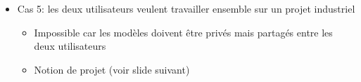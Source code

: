 \documentclass[t, english]{beamer}
\begin{document}
\begin{frame}[t,fragile]
{\begin{itemize}
\begin{itemize}
        \item Passage en compte privé d'un utilisateur
        \item Tentative d'accéder à un modèle par cet utilisateur,
          par l'autre utilisateur (échec)
      \end{itemize}
    \item Cas 5: les deux utilisateurs veulent travailler ensemble sur un
      projet industriel
      \begin{itemize}
        \item Impossible car les modèles doivent être privés mais partagés
          entre les deux utilisateurs
        \item Notion de projet (voir slide suivant)
      \end{itemize}
  \end{itemize}
}
\end{frame}
\end{document}
